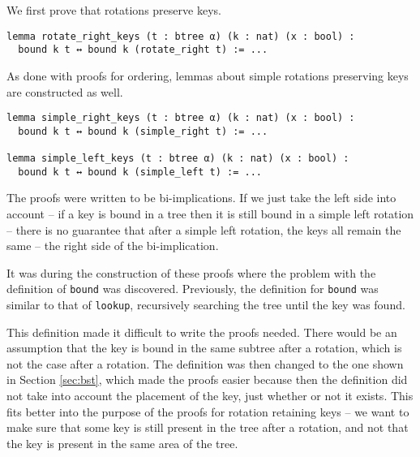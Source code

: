 We first prove that rotations preserve keys.

\begin{lstlisting}
lemma rotate_right_keys (t : btree α) (k : nat) (x : bool) :
  bound k t ↔ bound k (rotate_right t) := ...
\end{lstlisting}

As done with proofs for ordering, lemmas about simple rotations preserving keys are constructed as well.

\begin{lstlisting}
lemma simple_right_keys (t : btree α) (k : nat) (x : bool) :
  bound k t ↔ bound k (simple_right t) := ...
  
lemma simple_left_keys (t : btree α) (k : nat) (x : bool) :
  bound k t ↔ bound k (simple_left t) := ...
\end{lstlisting}

The proofs were written to be bi-implications. If we just take the left side into account -- if a key is bound in a tree then it is still bound in a simple left rotation -- there is no guarantee that after a simple left rotation, the keys all remain the same -- the right side of the bi-implication.  

It was during the construction of these proofs where the problem with the definition of \lstinline{bound} was discovered. Previously, the definition for \lstinline{bound} was similar to that of \lstinline{lookup}, recursively searching the tree until the key was found.

This definition made it difficult to write the proofs needed. There would be an assumption that the key is bound in the same subtree after a rotation, which is not the case after a rotation. The definition was then changed to the one shown in Section \ref{sec:bst}, which made the proofs easier because then the definition did not take into account the placement of the key, just whether or not it exists. This fits better into the purpose of the proofs for rotation retaining keys -- we want to make sure that some key is still present in the tree after a rotation, and not that the key is present in the same area of the tree.